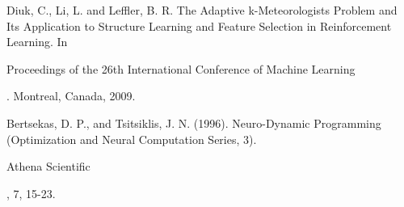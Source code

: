 \documentclass[conference]{IEEEtran}
\begin{document}
\begin{thebibliography}{1}
Diuk, C., Li, L. and Leffler, B. R. The Adaptive k-Meteorologists Problem and Its Application to Structure Learning and Feature Selection in Reinforcement Learning. In \begin{em} Proceedings of the 26th International Conference of Machine Learning\end{em}. Montreal, Canada, 2009. 

Bertsekas, D. P., and Tsitsiklis, J. N. (1996). Neuro-Dynamic Programming (Optimization and Neural Computation Series, 3). \begin{em}Athena Scientific\end{em}, 7, 15-23.

\end{thebibliography}




\end{document}
